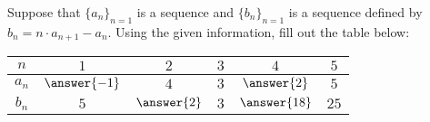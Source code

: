 \documentclass{ximera}
\author{Jim Talamo}
\begin{document}
\begin{exercise}

Suppose that $\{a_n\}_{n=1}$ is a sequence and $\{b_n\}_{n=1}$ is a sequence defined by $b_n = n \cdot a_{n+1} - a_n$. Using the given information, fill out the table below:  


\begin{tabular}{c||c|c|c|c|c}

$n$ \quad & \quad \quad $1$  \quad \quad & \quad \quad $2$ \quad \quad & \quad \quad $3$ \quad \quad & \quad \quad $4$ \quad \quad & \quad \quad $5$ \\
\hline 
$a_n$ \quad & \quad \quad $\answer{-1}$  \quad \quad & \quad \quad $4$ \quad \quad  & \quad \quad $3$ \quad \quad & \quad \quad  $\answer{2}$ \quad \quad  & \quad \quad $5$\\
\hline
$b_n$ \quad & \quad \quad $5$ \quad \quad & \quad \quad $\answer{2}$ \quad \quad & \quad \quad  $3$ \quad \quad & \quad \quad $\answer{18}$ \quad \quad & \quad \quad $25$ \\
\end{tabular}

 
    \end{exercise}
\end{document}
